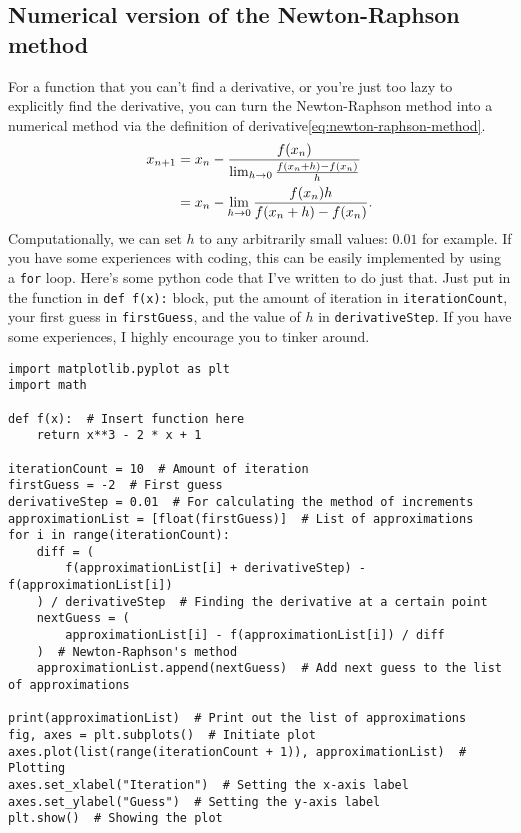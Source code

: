 \subsection{Numerical version of the Newton-Raphson method}

For a function that you can't find a derivative, or you're just too lazy to explicitly find the derivative, you can turn the Newton-Raphson method into a numerical method via the definition of derivative\cref{eq:newton-raphson-method}.
\begin{align}
	x_{n + 1} &= x_n - \frac{f(x_n)}{\lim_{h \rightarrow 0}\frac{f(x_n + h) - f(x_n)}{h}} \\
			  &= x_n - \lim_{h \rightarrow 0}\frac{f(x_n)h}{f(x_n + h) - f(x_n)}.
\end{align}
Computationally, we can set $h$ to any arbitrarily small values: $0.01$ for example. If you have some experiences with coding, this can be easily implemented by using a \texttt{for} loop. Here's some python code that I've written to do just that. Just put in the function in \texttt{def f(x):} block, put the amount of iteration in \texttt{iterationCount}, your first guess in \texttt{firstGuess}, and the value of $h$ in \texttt{derivativeStep}. If you have some experiences, I highly encourage you to tinker around.

\begin{verbatim}
import matplotlib.pyplot as plt
import math

def f(x):  # Insert function here
    return x**3 - 2 * x + 1

iterationCount = 10  # Amount of iteration
firstGuess = -2  # First guess
derivativeStep = 0.01  # For calculating the method of increments
approximationList = [float(firstGuess)]  # List of approximations
for i in range(iterationCount):
    diff = (
        f(approximationList[i] + derivativeStep) - f(approximationList[i])
    ) / derivativeStep  # Finding the derivative at a certain point
    nextGuess = (
        approximationList[i] - f(approximationList[i]) / diff
    )  # Newton-Raphson's method
    approximationList.append(nextGuess)  # Add next guess to the list of approximations

print(approximationList)  # Print out the list of approximations
fig, axes = plt.subplots()  # Initiate plot
axes.plot(list(range(iterationCount + 1)), approximationList)  # Plotting
axes.set_xlabel("Iteration")  # Setting the x-axis label
axes.set_ylabel("Guess")  # Setting the y-axis label
plt.show()  # Showing the plot
\end{verbatim}

